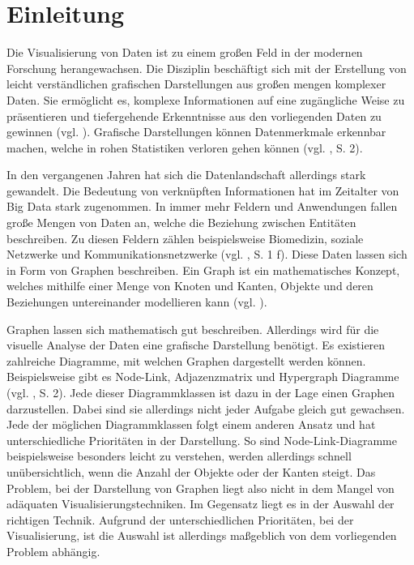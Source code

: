 
\chapter{Einleitung}

Die Visualisierung von Daten ist zu einem großen Feld in der modernen Forschung herangewachsen. Die Disziplin beschäftigt sich mit der Erstellung von leicht verständlichen grafischen Darstellungen aus großen mengen komplexer Daten. Sie ermöglicht es, komplexe Informationen auf eine zugängliche Weise zu präsentieren und tiefergehende Erkenntnisse aus den vorliegenden Daten zu gewinnen (vgl. \cite{wiki:DataVisualization}). Grafische Darstellungen können Datenmerkmale erkennbar machen, welche in rohen Statistiken verloren gehen können (vgl. \cite{unwin:WhyDataVisualization}, S. 2).

In den vergangenen Jahren hat sich die Datenlandschaft allerdings stark gewandelt. Die Bedeutung von verknüpften Informationen hat im Zeitalter von Big Data stark zugenommen. In immer mehr Feldern und Anwendungen fallen große Mengen von Daten an, welche die Beziehung zwischen Entitäten beschreiben. Zu diesen Feldern zählen beispielsweise Biomedizin, soziale Netzwerke und Kommunikationsnetzwerke (vgl. \cite{chen:SurveyGraphVisualization}, S. 1 f). Diese Daten lassen sich in Form von Graphen beschreiben. Ein Graph ist ein mathematisches Konzept, welches mithilfe einer Menge von Knoten und Kanten, Objekte und deren Beziehungen untereinander modellieren kann (vgl. \cite{wiki:Graph}).

Graphen lassen sich mathematisch gut beschreiben. Allerdings wird für die visuelle Analyse der Daten eine grafische Darstellung benötigt. Es existieren zahlreiche Diagramme, mit welchen Graphen dargestellt werden können. Beispielsweise gibt es Node-Link, Adjazenzmatrix und Hypergraph Diagramme (vgl. \cite{chen:SurveyGraphVisualization}, S. 2). Jede dieser Diagrammklassen ist dazu in der Lage einen Graphen darzustellen. Dabei sind sie allerdings nicht jeder Aufgabe gleich gut gewachsen. Jede der möglichen Diagrammklassen folgt einem anderen Ansatz und hat unterschiedliche Prioritäten in der Darstellung. So sind Node-Link-Diagramme beispielsweise besonders leicht zu verstehen, werden allerdings schnell unübersichtlich, wenn die Anzahl der Objekte oder der Kanten steigt. Das Problem, bei der Darstellung von Graphen liegt also nicht in dem Mangel von adäquaten Visualisierungstechniken. Im Gegensatz liegt es in der Auswahl der richtigen Technik. Aufgrund der unterschiedlichen Prioritäten, bei der Visualisierung, ist die Auswahl ist allerdings maßgeblich von dem vorliegenden Problem abhängig.

